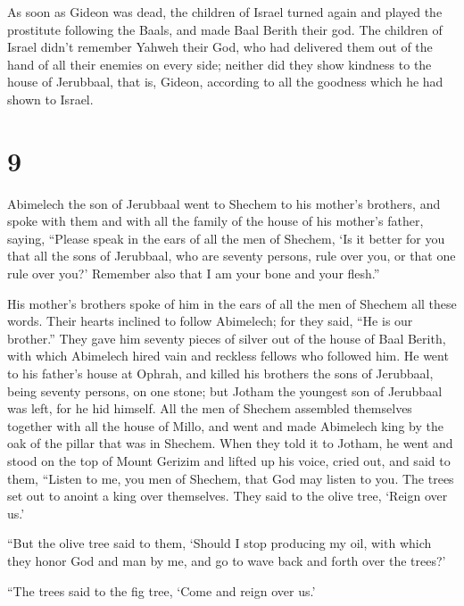  As soon as Gideon was dead, the children of Israel
turned again and played the prostitute following the Baals, and made
Baal Berith their god.  The children of Israel didn't
remember Yahweh their God, who had delivered them out of the hand of all
their enemies on every side;  neither did they show
kindness to the house of Jerubbaal, that is, Gideon, according to all
the goodness which he had shown to Israel.

\hypertarget{section-8}{%
\section{9}\label{section-8}}

 Abimelech the son of Jerubbaal went to Shechem to his
mother's brothers, and spoke with them and with all the family of the
house of his mother's father, saying,  ``Please speak in
the ears of all the men of Shechem, `Is it better for you that all the
sons of Jerubbaal, who are seventy persons, rule over you, or that one
rule over you?' Remember also that I am your bone and your flesh.''

 His mother's brothers spoke of him in the ears of all the
men of Shechem all these words. Their hearts inclined to follow
Abimelech; for they said, ``He is our brother.''  They
gave him seventy pieces of silver out of the house of Baal Berith, with
which Abimelech hired vain and reckless fellows who followed him.
 He went to his father's house at Ophrah, and killed his
brothers the sons of Jerubbaal, being seventy persons, on one stone; but
Jotham the youngest son of Jerubbaal was left, for he hid himself.
 All the men of Shechem assembled themselves together with
all the house of Millo, and went and made Abimelech king by the oak of
the pillar that was in Shechem.  When they told it to
Jotham, he went and stood on the top of Mount Gerizim and lifted up his
voice, cried out, and said to them, ``Listen to me, you men of Shechem,
that God may listen to you.  The trees set out to anoint a
king over themselves. They said to the olive tree, `Reign over us.'

 ``But the olive tree said to them, `Should I stop
producing my oil, with which they honor God and man by me, and go to
wave back and forth over the trees?'

 ``The trees said to the fig tree, `Come and reign over
us.'

